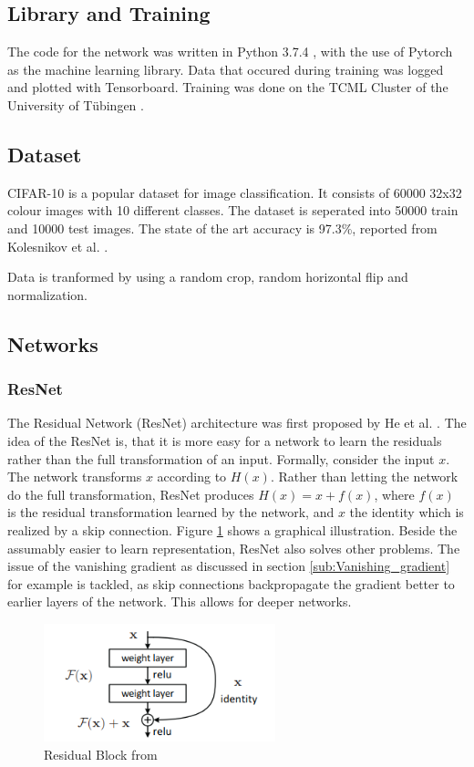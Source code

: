 \subsection{Library and Training}
The code for the network was written in Python 3.7.4 , with the use of Pytorch
\cite{NEURIPS2019_9015} as the machine learning library. Data that occured
during training was logged and plotted with Tensorboard. Training was done on
the TCML Cluster of the University of Tübingen \cite{TCML}.

\subsection{Dataset}\label{sub:Dataset}
CIFAR-10 \cite{CIFAR-10} is a popular dataset for image classification. It
consists of 60000 32x32 colour images with 10 different classes. The dataset is
seperated into 50000 train and 10000 test images. The state of the art accuracy
is 97.3\%, reported from Kolesnikov et al. \cite{kolesnikov2019big}.

Data is tranformed by using a random crop, random horizontal flip and
normalization.


\subsection{Networks}
\subsubsection{ResNet}\label{sub:ResNet}
The Residual Network (ResNet) architecture was first proposed by He et al.
\cite{he2016deep}. The idea of the ResNet is, that it is more easy for a
network to learn the residuals rather than the full transformation of an input.
Formally, consider the input $x$. The network transforms $x$ according to $H(x)$.
Rather than letting the network do the full transformation, ResNet produces
$H(x)= x +f(x)$, where $f(x)$ is the residual transformation learned by the
network, and $x$ the identity which is realized by a skip connection. Figure
\ref{fig:Residual_Block} shows a graphical illustration. Beside the assumably
easier to learn representation, ResNet also solves other problems. The issue of
the vanishing gradient as discussed in section \ref{sub:Vanishing_gradient} for
example is tackled, as skip connections backpropagate the gradient better to
earlier layers of the network. This allows for deeper networks.

\begin{figure}[H]
    \centering
    \includegraphics[width=0.6\textwidth]{images/Residual_Block.png}
    \caption{Residual Block from \cite[Page 2]{he2016deep}}
    \label{fig:Residual_Block}
\end{figure}

